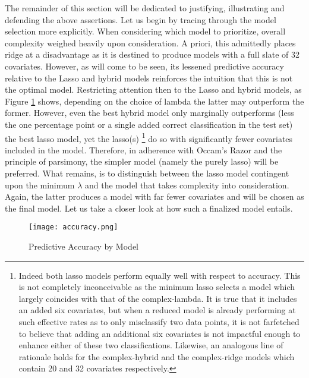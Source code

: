 \documentclass[11pt]{article}
\begin{document}
	The remainder of this section will be dedicated to justifying, illustrating and defending the above assertions.  Let us begin by tracing through the model selection more explicitly.  When considering which model to prioritize, overall complexity weighed heavily upon consideration.  A priori, this admittedly places ridge at a disadvantage as it is destined to produce models with a full slate of 32 covariates.  However, as will come to be seen, its lessened predictive accuracy relative to the Lasso and hybrid models reinforces the intuition that this is not the optimal model.  Restricting attention then to the Lasso and hybrid models, as Figure \ref{fig:acc} shows, depending on the choice of lambda the latter may outperform the former.  However, even the best hybrid model only marginally outperforms (less the one percentage point or a single added correct classification in the test set) the best lasso model, yet the lasso(s) \footnote{Indeed both lasso models perform equally well with respect to accuracy.  This is not completely inconceivable as the minimum lasso selects a model which largely coincides  with that of the complex-lambda.  It is true that it includes an added six covariates, but when a reduced model is already performing at such effective rates as to only misclassify two data points, it is not farfetched to believe that adding an additional six covariates is not impactful enough to enhance either of these two classifications.  Likewise, an analogous line of rationale holds for the complex-hybrid and the complex-ridge models which contain 20 and 32 covariates respectively. } do so with significantly fewer covariates included in the model.   Therefore, in adherence with Occam's Razor and the principle of parsimony, the simpler model (namely the purely lasso) will be preferred.  What remains, is to distinguish between the lasso model contingent upon the minimum $\lambda$ and the model that takes complexity into consideration.  Again, the latter produces a model with far fewer covariates and will be chosen as the final model.  Let us take a closer look at how such a finalized model entails.    
		
	

	
	
\begin{figure}[htbp]
\centerline{\texttt{[image: accuracy.png]}}
\caption{Predictive Accuracy by Model}\label{fig:acc}
\end{figure}
\end{document}
